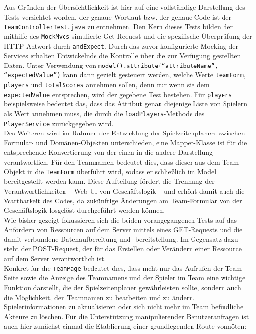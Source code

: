 Aus Gründen der Übersichtlichkeit ist hier auf eine vollständige Darstellung des 
Tests verzichtet worden, der genaue Wortlaut bzw. der genaue Code ist der 
\href{https://github.com/FlorianOhmes/bat_spielzeitenplaner/blob/main/spielzeitenplaner/src/test/java/de/bathesis/spielzeitenplaner/web/TeamControllerTest.java}{\texttt{TeamControllerTest.java}} 
zu entnehmen. Den Kern dieses Tests bilden der mithilfe des \texttt{MockMvcs} 
simulierte Get-Request und die spezifische Überprüfung der HTTP-Antwort durch 
\texttt{andExpect}. Durch das zuvor konfigurierte Mocking der Services 
erhalten Entwickelnde die Kontrolle über die zur Verfügung gestellten Daten. Unter 
Verwendung von \texttt{model().attribute(``attributeName'', ``expectedValue'')} 
kann dann gezielt gesteuert werden, welche Werte \texttt{teamForm}, 
\texttt{players} und \texttt{totalScores} annehmen sollen, denn nur wenn sie dem 
\texttt{expectedValue} entsprechen, wird der gegebene Test bestehen. Für 
\texttt{players} beispielsweise bedeutet das, dass das Attribut genau diejenige 
Liste von Spielern als Wert annehmen muss, die durch die 
\texttt{loadPlayers}-Methode des \texttt{PlayerService} zurückgegeben wird. \\ 
Des Weiteren wird im Rahmen der Entwicklung des Spielzeitenplaners zwischen Formular- 
und Domänen-Objekten unterschieden, eine Mapper-Klasse ist für die entsprechende 
Konvertierung von der einen in die andere Darstellung verantwortlich. Für den 
Teamnamen bedeutet dies, dass dieser aus dem Team-Objekt in die \texttt{TeamForm} 
überführt wird, sodass er schließlich im Model bereitgestellt werden kann. Diese 
Aufteilung fördert die Trennung der Verantwortlichkeiten -- Web-UI von Geschäftslogik -- 
und erhöht damit auch die Wartbarkeit des Codes, da zukünftige Änderungen am 
Team-Formular von der Geschäftslogik losgelöst durchgeführt werden können. \\ 
Wie bisher gezeigt fokussieren sich die beiden vorangegangenen Tests auf das 
Anfordern von Ressourcen auf dem Server mittels eines GET-Requests und die damit 
verbundene Datenaufbereitung und -bereitstellung. Im Gegensatz dazu steht der 
POST-Request, der für das Erstellen oder Verändern einer Ressource auf dem Server 
verantwortlich ist. \\ 
Konkret für die \texttt{TeamPage} bedeutet dies, dass nicht nur das Aufrufen der 
Team-Seite sowie die Anzeige des Teamnamens und der Spieler im Team eine wichtige 
Funktion darstellt, die der Spielzeitenplaner gewährleisten sollte, sondern auch 
die Möglichkeit, den Teamnamen zu bearbeiten und zu ändern, Spielerinformationen zu 
aktualisieren oder sich nicht mehr im Team befindliche Akteure zu löschen. Für die 
Unterstützung manipulierender Benutzeranfragen ist auch hier zunächst einmal die 
Etablierung einer grundlegenden Route vonnöten: 


